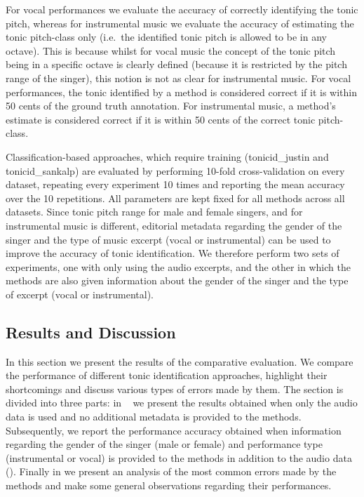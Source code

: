 For vocal performances we evaluate the accuracy of correctly identifying the tonic pitch, whereas for instrumental music we evaluate the accuracy of estimating the tonic pitch-class only (i.e.~the identified tonic pitch is allowed to be in any octave). This is because whilst for vocal music the concept of the tonic pitch being in a specific octave is clearly defined (because it is restricted by the pitch range of the singer), this notion is not as clear for instrumental music. For vocal performances, the tonic identified by a method is considered correct if it is within 50 cents of the ground truth annotation. For instrumental music, a method's estimate is considered correct if it is within 50 cents of the correct tonic pitch-class.

Classification-based approaches, which require training (\acrshort{tonicid_justin} and \acrshort{tonicid_sankalp}) are evaluated by performing 10-fold cross-validation on every dataset, repeating
every experiment 10 times and reporting the mean accuracy over the 10 repetitions. All parameters are kept fixed for all methods across all datasets. Since tonic pitch range for male and female singers, and for instrumental music is different, editorial metadata regarding the gender of the singer and the type of music excerpt (vocal or instrumental) can be used to improve the accuracy of tonic identification. We therefore perform two sets of experiments, one with only using the audio excerpts, and the other in which the methods are also given information about the gender of the singer and the type of excerpt (vocal or instrumental). 

\subsection{Results and Discussion}
\label{sec:pre_processing_tonic_identification_results}

In this section we present the results of the comparative evaluation. We compare the performance of different tonic identification approaches, highlight their shortcomings and discuss various types of errors made by them. The section is divided into three parts: in ~ we present the results obtained when only the audio data is used and no additional metadata is provided to the methods. Subsequently, we report the performance accuracy
obtained when information regarding the gender of the singer (male or female) and performance type (instrumental or vocal) is provided to the methods in addition to the audio data (). Finally in  we present an analysis of the most common errors made by the methods and make some general observations regarding their performances.

